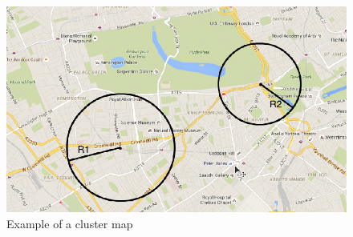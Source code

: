 \begin{figure}[ht]
\centering
\includegraphics[scale=.46]{C3/mapclusters}
\caption{Example of a cluster map}
\end{figure}


